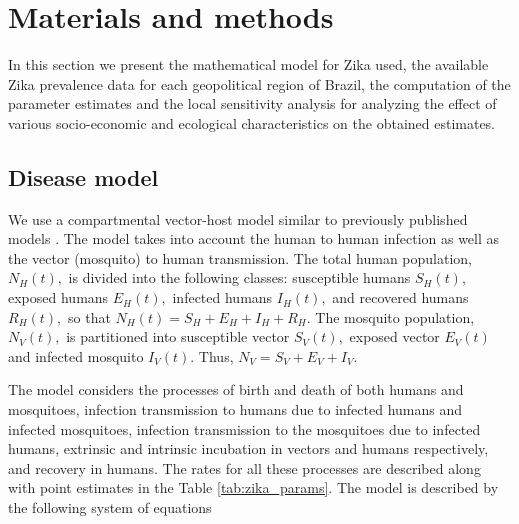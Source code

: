 \documentclass[10pt,letterpaper]{article}
\begin{document}
\section*{Materials and methods}
In this section we present the mathematical model for Zika used, the available Zika prevalence data for each geopolitical region of Brazil, the computation of the parameter estimates and the local sensitivity analysis for analyzing the effect of various socio-economic and ecological characteristics on the obtained estimates.
\subsection*{Disease model}
We use a compartmental vector-host model similar to previously published models \cite{bonyah2017theoretical,moreno2017role,suparit2018mathematical,dantas2018calibration}. The model takes into account the human to human infection as well as the vector (mosquito) to human transmission. The total human population, $N_{H}(t),$ is divided into the following classes: susceptible humans $S_{H}(t),$ exposed humans $E_{H}(t),$ infected humans $I_{H}(t),$ and recovered humans $R_{H}(t),$ so that $N_{H}(t)=S_{H}+E_{H}+I_{H}+R_{H}$. The mosquito population, $N_{V}(t),$ is partitioned into susceptible vector $S_{V}(t),$ exposed vector $E_{V}(t)$ and infected mosquito $I_{V}(t)$. Thus, $N_{V}=S_{V}+E_{V}+I_{V}$.

The model considers the processes of birth and death of both humans and mosquitoes, infection transmission to humans due to infected humans and infected mosquitoes, infection transmission to the mosquitoes due to infected humans, extrinsic and intrinsic incubation in vectors and humans respectively, and recovery in humans. The rates for all these processes are described along with point estimates in the Table \ref{tab:zika_params}. The model is described by the following system of equations

\end{document}
